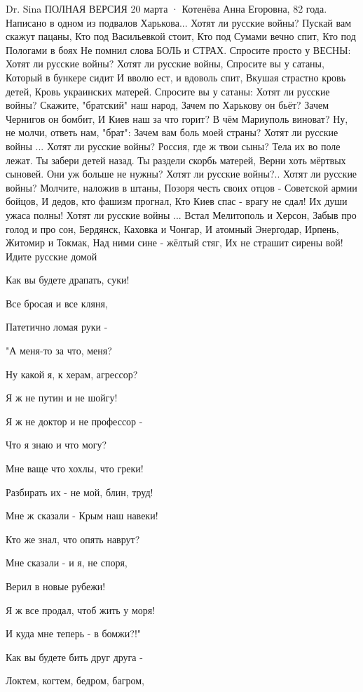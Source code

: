 Dr. Sina ПОЛНАЯ ВЕРСИЯ
20 марта ·
Котенёва Анна Егоровна, 82 года.
Написано в одном из подвалов Харькова...
Хотят ли русские войны?
Пускай вам скажут пацаны,
Кто под Васильевкой стоит,
Кто под Сумами вечно спит,
Кто под Пологами в боях
Не помнил слова БОЛЬ и СТРАХ.
Спросите просто у ВЕСНЫ:
Хотят ли русские войны?
Хотят ли русские войны,
Спросите вы у сатаны,
Который в бункере сидит
И вволю ест, и вдоволь спит,
Вкушая страстно кровь детей,
Кровь украинских матерей.
Спросите вы у сатаны:
Хотят ли русские войны?
Скажите, "братский" наш народ,
Зачем по Харькову он бьёт?
Зачем Чернигов он бомбит,
И Киев наш за что горит?
В чём Мариуполь виноват?
Ну, не молчи, ответь нам, "брат":
Зачем вам боль моей страны?
Хотят ли русские войны ...
Хотят ли русские войны?
Россия, где ж твои сыны?
Тела их во поле лежат.
Ты забери детей назад.
Ты раздели скорбь матерей,
Верни хоть мёртвых сыновей.
Они уж больше не нужны?
Хотят ли русские войны?..
Хотят ли русские войны?
Молчите, наложив в штаны,
Позоря честь своих отцов -
Советской армии бойцов,
И дедов, кто фашизм прогнал,
Кто Киев спас - врагу не сдал!
Их души ужаса полны!
Хотят ли русские войны ...
Встал Мелитополь и Херсон,
Забыв про голод и про сон,
Бердянск, Каховка и Чонгар,
И атомный Энергодар,
Ирпень, Житомир и Токмак,
Над ними сине - жёлтый стяг,
Их не страшит сирены вой!
Идите русские домой


Как вы будете драпать, суки!

Все бросая и все кляня,

Патетично ломая руки -

"А меня-то за что, меня?

Ну какой я, к херам, агрессор?

Я ж не путин и не шойгу!

Я ж не доктор и не профессор -

Что я знаю и что могу?

Мне ваще что хохлы, что греки!

Разбирать их - не мой, блин, труд!

Мне ж сказали - Крым наш навеки!

Кто же знал, что опять наврут?

Мне сказали - и я, не споря,

Верил в новые рубежи!

Я ж все продал, чтоб жить у моря!

И куда мне теперь - в бомжи?!"

Как вы будете бить друг друга -

Локтем, когтем, бедром, багром,

